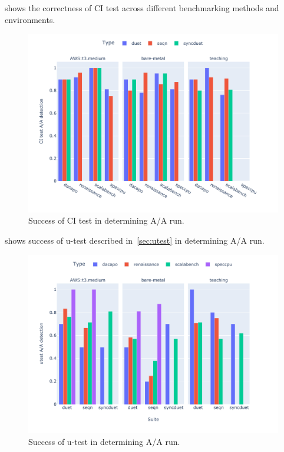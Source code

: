  shows the correctness of CI test across different benchmarking methods and environments.

\begin{figure}
	\centering
	\includegraphics[width=1\linewidth]{./figures/citest_aa_match.pdf}
	\caption{
		Success of CI test in determining A/A run.
	}
	\label{fig:citest_aa}
\end{figure}

 shows success of \mbox{u-test} described in~\cref{sec:utest} in determining A/A run.

\begin{figure}
	\centering
	\includegraphics[width=1\linewidth]{./figures/utest_aa_match.pdf}
	\caption{
		Success of \mbox{u-test} in determining A/A run.
	}
	\label{fig:utest_aa}
\end{figure}

